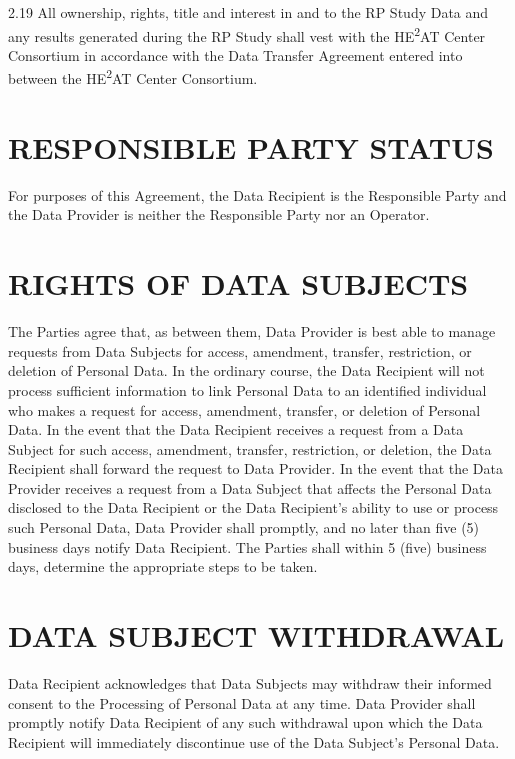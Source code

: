 
2.19 All ownership, rights, title and interest in and to the RP Study Data and any results generated during the RP Study shall vest with the HE\textsuperscript{2}AT Center Consortium in accordance with the Data Transfer Agreement entered into between the HE\textsuperscript{2}AT Center Consortium.

\section{RESPONSIBLE PARTY STATUS}

For purposes of this Agreement, the Data Recipient is the Responsible Party and the Data Provider is neither the Responsible Party nor an Operator.

\section{RIGHTS OF DATA SUBJECTS}

The Parties agree that, as between them, Data Provider is best able to manage requests from Data Subjects for access, amendment, transfer, restriction, or deletion of Personal Data. In the ordinary course, the Data Recipient will not process sufficient information to link Personal Data to an identified individual who makes a request for access, amendment, transfer, or deletion of Personal Data. In the event that the Data Recipient receives a request from a Data Subject for such access, amendment, transfer, restriction, or deletion, the Data Recipient shall forward the request to Data Provider. In the event that the Data Provider receives a request from a Data Subject that affects the Personal Data disclosed to the Data Recipient or the Data Recipient's ability to use or process such Personal Data, Data Provider shall promptly, and no later than five (5) business days notify Data Recipient. The Parties shall within 5 (five) business days, determine the appropriate steps to be taken.

\section{DATA SUBJECT WITHDRAWAL}

Data Recipient acknowledges that Data Subjects may withdraw their informed consent to the Processing of Personal Data at any time. Data Provider shall promptly notify Data Recipient of any such withdrawal upon which the Data Recipient will immediately discontinue use of the Data Subject's Personal Data.

